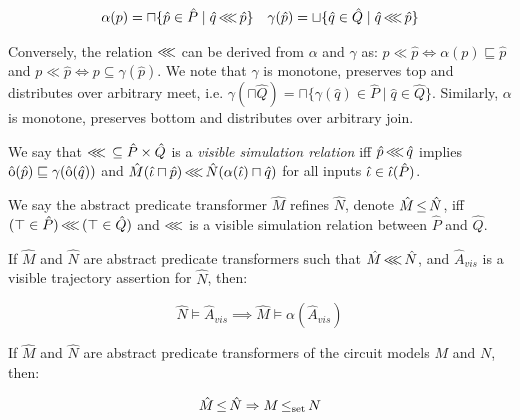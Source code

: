 \begin{align*}
\alpha(p) = \sqcap \{ \hat p \in \hat P \mid \hat q \operatorname{\lll} \hat p \} && \gamma(\hat p) = \sqcup \{ \hat q \in \hat Q \mid \hat q \operatorname{\lll} \hat p \}
\end{align*}

\noindent Conversely, the relation $\operatorname{\lll}$ can be derived from $\alpha$ and $\gamma$ as: $p \ll \hat p \iff \alpha(p) \sqsubseteq \hat p$ and $p \ll \hat p \iff p \subseteq \gamma(\hat p)$. We note that $\gamma$ is monotone, preserves top and distributes over arbitrary meet, i.e. $\gamma(\sqcap \hat Q) = \sqcap \{ \gamma(\hat q) \in \hat P \mid \hat q \in \hat Q\}$. Similarly, $\alpha$ is monotone, preserves bottom and distributes over arbitrary join.

We say that $\operatorname{\lll} \, \subseteq \hat P \times \hat Q$ is a \textit{visible simulation relation} iff $\hat p \operatorname{\lll} \hat q$ implies $\operatorname{\hat{\mathrm{o}}}(\hat p) \sqsubseteq \gamma(\operatorname{\hat{\mathrm{o}}}(\hat q))$ and $\hat M(\hat \iota \sqcap \hat p) \operatorname{\lll} \hat N(\alpha(\hat \iota) \sqcap \hat q)$ for all inputs $\hat \iota \in \operatorname{\hat{\iota}}(\hat P)$.

We say the abstract predicate transformer $\hat M$ refines $\hat N$, denote $\hat M \operatorname{\leq} \hat N$, iff $(\top \in \hat P) \operatorname{\lll} \, (\top \in \hat Q)$ and $\operatorname{\lll}$ is a visible simulation relation between $\hat P$ and $\hat Q$.


\begin{theorem} \label{thm:refinement}
If $\hat M$ and $\hat N$ are abstract predicate transformers such that $\hat M \operatorname{\lll} \hat N$, and $\hat A_{vis}$ is a visible trajectory assertion for $\hat N$, then:

\begin{equation*}
\hat N \models \hat A_{vis} \implies \hat M \models \alpha(\hat A_{vis})
\end{equation*}
\end{theorem}

\begin{theorem} \label{thm:refinement-impl}
If $\hat M$ and $\hat N$ are abstract predicate transformers of the circuit models $M$ and $N$, then:

\begin{equation*}
\hat M \operatorname{\leq} \hat N \Rightarrow M \operatorname{\leq_{\textrm{set}}} N
\end{equation*}
\end{theorem}
